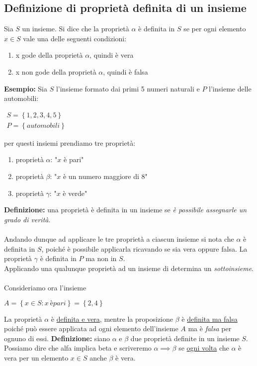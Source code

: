 \documentclass[a4paper]{article}
\begin{document}
\subsection{Definizione di proprietà definita di un insieme}
Sia $S$ un insieme. Si dice che la proprietà $\alpha$ è definita in $S$ se per ogni elemento $x\in S$ vale una delle seguenti condizioni:
\begin{enumerate}
	\item x gode della proprietà $\alpha$, quindi è vera
	\item x non gode della proprietà $\alpha$, quindi è falsa
\end{enumerate}
\textbf{Esempio:}
Sia $S$ l'insieme formato dai primi 5 numeri naturali e $P$ l'insieme delle automobili:
\begin{center}
	\begin{math}
		\begin{array}{l}
			S=\left\lbrace 1,2,3,4,5\right\rbrace \\
			P=\left\lbrace automobili\right\rbrace 
		\end{array}
	\end{math}
\end{center}
per questi insiemi prendiamo tre proprietà:
\begin{enumerate}
	\item proprietà $\alpha$: "$x$ è pari"
	\item proprietà $\beta$: "$x$ è un numero maggiore di $8$"
	\item proprietà $\gamma$: "$x$ è verde"
\end{enumerate}
\textbf{Definizione: }una proprietà è definita in un insieme se \textit{è possibile assegnarle un grado di verità}.\\ \\
Andando dunque ad applicare le tre proprietà a ciascun insieme si nota che $\alpha$ è definita in $S$, poiché è possibile applicarla ricavando se sia vera oppure falsa. La proprietà $\gamma$ è definita in $P$ ma non in $S$.
\\
Applicando una qualunque proprietà ad un insieme di determina un \textit{sottoinsieme}.
\\
\\
Consideriamo ora l'insieme
\begin{center}
	\begin{math}
		A=\left\lbrace x\in S : x \ è pari\right\rbrace = \left\lbrace 2,4\right\rbrace 
	\end{math}
\end{center}
La proprietà $\alpha$ è \underline{definita e vera}, mentre la proposizione $\beta$ è \underline{definita ma falsa} poiché può essere applicata ad ogni elemento dell'insieme $A$ ma è \textit{falsa} per ognuno di essi.
\textbf{Definizione: }siano $\alpha$ e $\beta$ due proprietà definite in un insieme $S$. Possiamo dire che alfa implica beta e scriveremo $\alpha \implies \beta$ se \underline{ogni volta} che $\alpha$ è vera per un elemento $x \in S$ anche $\beta$ è vera.
\end{document}
